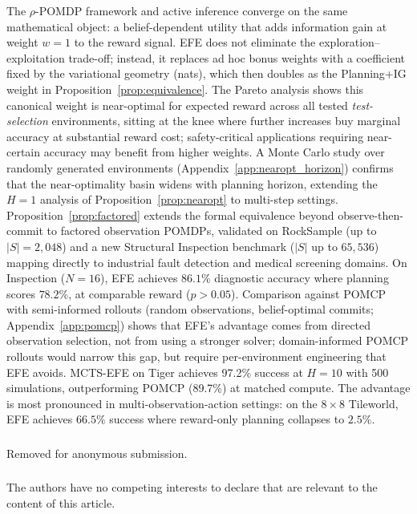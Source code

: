 \documentclass[runningheads]{llncs}
\begin{document}
The $\rho$-POMDP framework and active inference converge on the same mathematical object: a belief-dependent utility that adds information gain at weight $w{=}1$ to the reward signal. EFE does not eliminate the exploration--exploitation trade-off; instead, it replaces ad hoc bonus weights with a coefficient fixed by the variational geometry (nats), which then doubles as the Planning+IG weight in Proposition~\ref{prop:equivalence}. The Pareto analysis shows this canonical weight is near-optimal for expected reward across all tested \emph{test-selection} environments, sitting at the knee where further increases buy marginal accuracy at substantial reward cost; safety-critical applications requiring near-certain accuracy may benefit from higher weights. A Monte Carlo study over randomly generated environments (Appendix~\ref{app:nearopt_horizon}) confirms that the near-optimality basin widens with planning horizon, extending the $H{=}1$ analysis of Proposition~\ref{prop:nearopt} to multi-step settings. Proposition~\ref{prop:factored} extends the formal equivalence beyond observe-then-commit to factored observation POMDPs, validated on RockSample (up to $|S|{=}2{,}048$) and a new Structural Inspection benchmark ($|S|$ up to $65{,}536$) mapping directly to industrial fault detection and medical screening domains. On Inspection ($N{=}16$), EFE achieves $86.1\%$ diagnostic accuracy where planning scores $78.2\%$, at comparable reward ($p > 0.05$). Comparison against POMCP with semi-informed rollouts (random observations, belief-optimal commits; Appendix~\ref{app:pomcp}) shows that EFE's advantage comes from directed observation selection, not from using a stronger solver; domain-informed POMCP rollouts would narrow this gap, but require per-environment engineering that EFE avoids. MCTS-EFE on Tiger achieves 97.2\% success at $H{=}10$ with 500 simulations, outperforming POMCP (89.7\%) at matched compute. The advantage is most pronounced in multi-observation-action settings: on the $8{\times}8$ Tileworld, EFE achieves $66.5\%$ success where reward-only planning collapses to $2.5\%$.

\begin{credits}
\subsubsection{\ackname} Removed for anonymous submission.

\subsubsection{\discintname}
The authors have no competing interests to declare that are relevant to the content of this article.
\end{credits}
\end{document}
